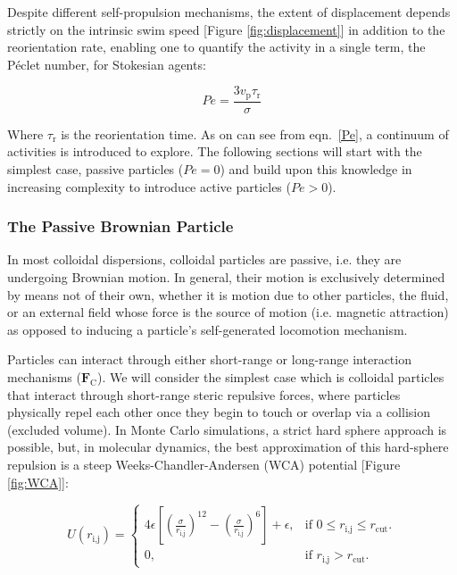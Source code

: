 \documentclass[11pt]{article}
\begin{document}
Despite different self-propulsion mechanisms, the extent of displacement depends strictly on the intrinsic swim speed [Figure \ref{fig:displacement}] in addition to the reorientation rate, enabling one to quantify the activity in a single term, the P\'{e}clet number, for Stokesian agents:

\begin{equation}\label{Pe}
    Pe = \frac{3v_{\text{p}}\tau_{\text{r}}}{\sigma}
\end{equation}

\noindent Where $\tau_{\text{r}}$ is the reorientation time.  As on can see from eqn.~\ref{Pe}, a continuum of activities is introduced to explore. The following sections will start with the simplest case, passive particles ($Pe=0$) and build upon this knowledge in increasing complexity to introduce active particles ($Pe>0$).



\subsubsection{The Passive Brownian Particle}\label{passiveparticlesystem}

 In most colloidal dispersions, colloidal particles are passive, i.e. they are undergoing Brownian motion. In general, their motion is exclusively determined by means not of their own, whether it is motion due to other particles, the fluid, or an external field whose force is the source of motion (i.e. magnetic attraction) as opposed to inducing a particle's self-generated locomotion mechanism.  
 
 Particles can interact through either short-range or long-range interaction mechanisms ($\boldsymbol{F}_{\text{C}}$).  We will consider the simplest case which is colloidal particles that interact through short-range steric repulsive forces, where particles physically repel each other once they begin to touch or overlap via a collision (excluded volume).  In Monte Carlo simulations, a strict hard sphere approach is possible, but, in molecular dynamics, the best approximation of this hard-sphere repulsion is a steep Weeks-Chandler-Andersen (WCA) potential [Figure \ref{fig:WCA}]:
 
\begin{equation}\label{LJ}
  U(r_{\text{i,j}})=\begin{cases}
    4\epsilon\left[\left(\frac{\sigma}{r_{\text{i,j}}}\right)^{{12}}-\left(\frac{\sigma}{r_{\text{i,j}}}\right)^6\right]+\epsilon, & \text{if $0\leq r_\text{i,j} \leq r_\text{cut}$}.\\
    0, & \text{if $r_\text{i,j}>r_\text{cut}$}.
  \end{cases}
\end{equation}
 
\end{document}
